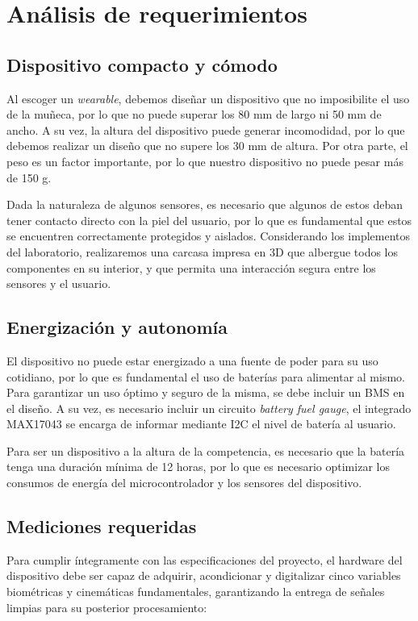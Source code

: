 \documentclass[letterpaper,11pt]{article}
\begin{document}
\section{Análisis de requerimientos}
\subsection{Dispositivo compacto y cómodo}
Al escoger un \textit{wearable}, debemos diseñar un dispositivo que no imposibilite el uso de la muñeca, por lo que no puede superar los 80 mm de largo ni 50 mm de ancho.  A su vez, la altura del dispositivo puede generar incomodidad, por lo que debemos realizar un diseño que no supere los 30 mm de altura. Por otra parte, el peso es un factor importante, por lo que nuestro dispositivo no puede pesar más de 150 g.

Dada la naturaleza de algunos sensores, es necesario que algunos de estos deban tener contacto directo con la piel del usuario, por lo que es fundamental que estos se encuentren correctamente protegidos y aislados. Considerando los implementos del laboratorio, realizaremos una carcasa impresa en 3D que albergue todos los componentes en su interior, y que permita una interacción segura entre los sensores y el usuario.


\subsection{Energización y autonomía}
El dispositivo no puede estar energizado a una fuente de poder para su uso cotidiano, por lo que es fundamental el uso de baterías para alimentar al mismo. Para garantizar un uso óptimo y seguro de la misma, se debe incluir un BMS en el diseño. A su vez, es necesario incluir un circuito \textit{battery fuel gauge}, el integrado MAX17043 se encarga de informar mediante I2C el nivel de batería al usuario.

Para ser un dispositivo a la altura de la competencia, es necesario que la batería tenga una duración mínima de 12 horas, por lo que es necesario optimizar los consumos de energía del microcontrolador y los sensores del dispositivo.

\subsection{Mediciones requeridas}

Para cumplir íntegramente con las especificaciones del proyecto, el hardware del dispositivo debe ser capaz de adquirir, acondicionar y digitalizar cinco variables biométricas y cinemáticas fundamentales, garantizando la entrega de señales limpias para su posterior procesamiento:
\end{document}
